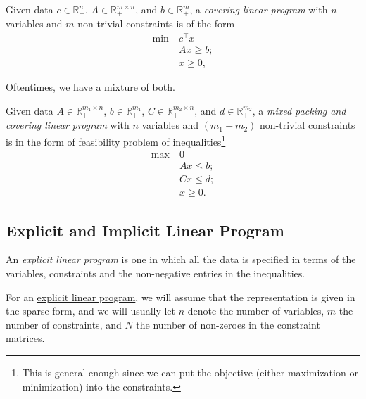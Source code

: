 \begin{definition}\label{def:covering-LP}
	Given data \(c \in \mathbb{R} _{+}^n\), \(A \in \mathbb{R} _{+}^{m \times n}\), and \(b \in \mathbb{R} _{+}^m\), a \emph{covering linear program} with \(n\) variables and \(m\) non-trivial constraints is of the form
	\[
		\begin{aligned}
			\min~ & c^{\top} x  \\
			      & Ax \geq b ; \\
			      & x \geq 0,
		\end{aligned}
	\]
\end{definition}

Oftentimes, we have a mixture of both.

\begin{definition}\label{def:mixed-packing-covering-LP}
	Given data \(A \in \mathbb{R} _{+}^{m_1 \times n}\), \(b \in \mathbb{R} _{+}^{m_1}\), \(C \in \mathbb{R} _{+}^{m_2 \times n}\), and \(d \in \mathbb{R} _{+}^{m_2}\), a \emph{mixed packing and covering linear program} with \(n\) variables and \((m_1 + m_2)\) non-trivial constraints is in the form of feasibility problem of inequalities\footnote{This is general enough since we can put the objective (either maximization or minimization) into the constraints.}
	\[
		\begin{aligned}
			\max~ & 0           \\
			      & Ax \leq b ; \\
			      & Cx \leq d ; \\
			      & x \geq 0.
		\end{aligned}
	\]
\end{definition}

\subsection{Explicit and Implicit Linear Program}
\begin{definition}\label{def:explicit-LP}
	An \emph{explicit linear program} is one in which all the data is specified in terms of the variables, constraints and the non-negative entries in the inequalities.
\end{definition}

For an \hyperref[def:explicit-LP]{explicit linear program}, we will assume that the representation is given in the sparse form, and we will usually let \(n\) denote the number of variables, \(m\) the number of constraints, and \(N\) the number of non-zeroes in the constraint matrices.

